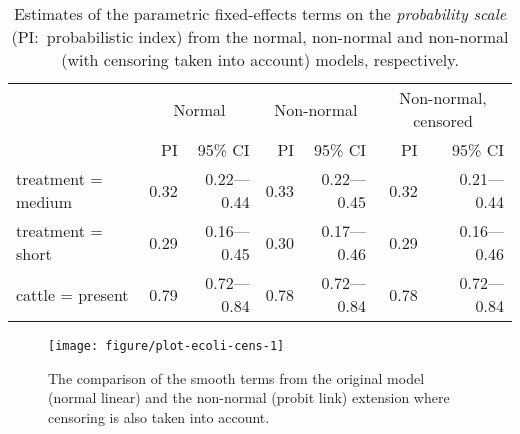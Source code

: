 \documentclass[11pt]{article}\usepackage[]{graphicx}\usepackage{xcolor}
\newenvironment{knitrout}{}{} %
\newcommand{\0}{{\mathbf{0}}}
\begin{document}
\begin{table}[!ht]
  \centering
  \caption{
    Estimates of the parametric fixed-effects
    terms on the \emph{probability scale}
    (PI:~probabilistic index) from the normal, non-normal
    and non-normal (with censoring taken into account) models,
    respectively.
  }\label{tbl:ecoli-fes}
\begin{tabular}{lrrrrrr}
  \toprule
  & \multicolumn{2}{c}{Normal} & \multicolumn{2}{c}{Non-normal} & \multicolumn{2}{c}{Non-normal, censored} \\
 \cmidrule(lr){2-3} \cmidrule(lr){4-5} \cmidrule(lr){6-7} & PI & 95\% CI  & PI & 95\% CI  & PI & 95\% CI  \\
 \midrule
treatment = medium & 0.32 & 0.22---0.44 & 0.33 & 0.22---0.45 & 0.32 & 0.21---0.44 \\ 
  treatment = short & 0.29 & 0.16---0.45 & 0.30 & 0.17---0.46 & 0.29 & 0.16---0.46 \\ 
  cattle = present & 0.79 & 0.72---0.84 & 0.78 & 0.72---0.84 & 0.78 & 0.72---0.84 \\ 
   \bottomrule
\end{tabular}


\end{table}


\begin{figure}[!ht]
  \centering

\begin{knitrout}\small
{}\color{fgcolor}
\texttt{[image: figure/plot-ecoli-cens-1]} 
\end{knitrout}

\caption{
  The comparison of the smooth terms
  from the original model (normal linear)
  and the non-normal (probit link) extension
  where censoring is also taken into account.
}\label{fig:ecoli-cens}
\end{figure}
\end{document}
